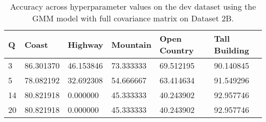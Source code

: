 \begin{table}[H]
\centering
\begin{tabular}{l l l l l l}
\hline
\hline
\textbf{Q} & \textbf{Coast} & \textbf{Highway} & \textbf{Mountain} & \textbf{Open Country} & \textbf{Tall Building} \\
\hline
\hline
3 & 86.301370 & 46.153846 & 73.333333 & 69.512195 & 90.140845 \\
5 & 78.082192 & 32.692308 & 54.666667 & 63.414634 & 91.549296 \\
14 & 80.821918 & 0.000000 & 45.333333 & 40.243902 & 92.957746 \\
20 & 80.821918 & 0.000000 & 45.333333 & 40.243902 & 92.957746\\
\hline
\end{tabular}
\caption{Accuracy across hyperparameter values on the dev dataset using the GMM model with full covariance matrix on Dataset 2B.}
\label{tab:2b_full_dev}
\end{table}
